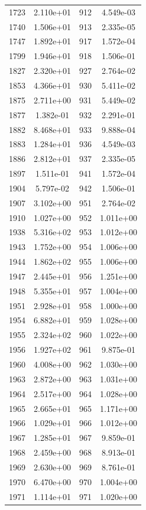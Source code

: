 \documentclass[12pt]{article}
\begin{document}
\begin{longtable}{@{}cccc@{}}
1723 & 2.110e+01 & 912 & 4.549e-03 \\
1740 & 1.506e+01 & 913 & 2.335e-05 \\
1747 & 1.892e+01 & 917 & 1.572e-04 \\
1799 & 1.946e+01 & 918 & 1.506e-01 \\
1827 & 2.320e+01 & 927 & 2.764e-02 \\
1853 & 4.366e+01 & 930 & 5.411e-02 \\
1875 & 2.711e+00 & 931 & 5.449e-02 \\
1877 & 1.382e-01 & 932 & 2.291e-01 \\
1882 & 8.468e+01 & 933 & 9.888e-04 \\
1883 & 1.284e+01 & 936 & 4.549e-03 \\
1886 & 2.812e+01 & 937 & 2.335e-05 \\
1897 & 1.511e-01 & 941 & 1.572e-04 \\
1904 & 5.797e-02 & 942 & 1.506e-01 \\
1907 & 3.102e+00 & 951 & 2.764e-02 \\
1910 & 1.027e+00 & 952 & 1.011e+00 \\
1938 & 5.316e+02 & 953 & 1.012e+00 \\
1943 & 1.752e+00 & 954 & 1.006e+00 \\
1944 & 1.862e+02 & 955 & 1.006e+00 \\
1947 & 2.445e+01 & 956 & 1.251e+00 \\
1948 & 5.355e+01 & 957 & 1.004e+00 \\
1951 & 2.928e+01 & 958 & 1.000e+00 \\
1954 & 6.882e+01 & 959 & 1.028e+00 \\
1955 & 2.324e+02 & 960 & 1.022e+00 \\
1956 & 1.927e+02 & 961 & 9.875e-01 \\
1960 & 4.008e+00 & 962 & 1.030e+00 \\
1963 & 2.872e+00 & 963 & 1.031e+00 \\
1964 & 2.517e+00 & 964 & 1.028e+00 \\
1965 & 2.665e+01 & 965 & 1.171e+00 \\
1966 & 1.029e+01 & 966 & 1.012e+00 \\
1967 & 1.285e+01 & 967 & 9.859e-01 \\
1968 & 2.459e+00 & 968 & 8.913e-01 \\
1969 & 2.630e+00 & 969 & 8.761e-01 \\
1970 & 6.470e+00 & 970 & 1.004e+00 \\
1971 & 1.114e+01 & 971 & 1.020e+00 \\

\end{longtable}
\end{document}
